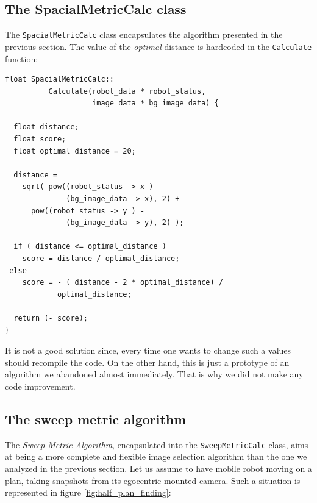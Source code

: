 \subsection{The SpacialMetricCalc class}
\label{concr:iimageselector:spacial_metric_class}

The \texttt{SpacialMetricCalc} class encapsulates the 
algorithm presented in the previous section.
The value of the \textit{optimal} distance is hardcoded in the
\texttt{Calculate} function:

\begin{lstlisting}[caption={\texttt{SweepMetricCalc} class declaration}, label={code:sweepmetriccalc}, frame=trBL]
float SpacialMetricCalc::
          Calculate(robot_data * robot_status, 
                    image_data * bg_image_data) {

  float distance;
  float score;
  float optimal_distance = 20;

  distance = 
    sqrt( pow((robot_status -> x ) - 
              (bg_image_data -> x), 2) +
	  pow((robot_status -> y ) - 
              (bg_image_data -> y), 2) );

  if ( distance <= optimal_distance )
    score = distance / optimal_distance;
 else
    score = - ( distance - 2 * optimal_distance) /
            optimal_distance;

  return (- score);
}
\end{lstlisting}

It is not a good solution since, every time one wants to change 
such a values should recompile the code. 
On the other hand, this is just a prototype of an algorithm we 
abandoned almost immediately. That is why we did not make any 
code improvement.


\subsection{The sweep metric algorithm}
\label{concr:iimageselector:sweep_metric_algorithm}

The  \textit{Sweep Metric Algorithm}, encapsulated into the 
\texttt{SweepMetricCalc} class, aims at being a more 
complete and flexible image selection algorithm than the one 
we analyzed in the previous section.
Let us assume to have  mobile robot moving on a plan, 
taking snapshots from its egocentric-mounted camera.
Such a situation is represented in figure 
\ref{fig:half_plan_finding}:

